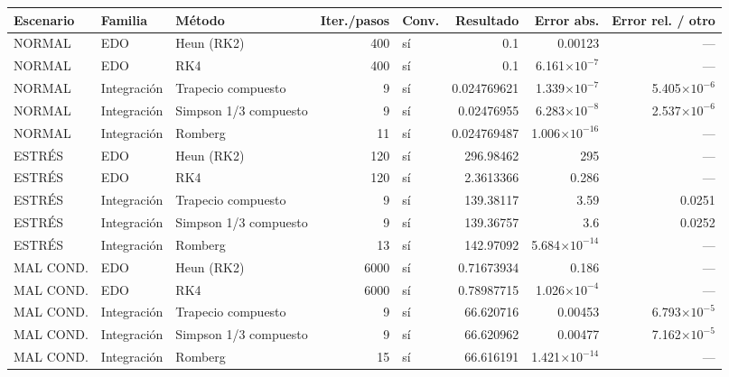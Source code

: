 {\footnotesize
\begin{longtable}{lllrlrrr}
\toprule
\textbf{Escenario} & \textbf{Familia} & \textbf{Método} & \textbf{Iter./pasos} & \textbf{Conv.} & \textbf{Resultado} & \textbf{Error abs.} & \textbf{Error rel. / otro} \\
\midrule
\endhead
NORMAL & EDO & Heun (RK2) & 400 & sí & 0.1 & 0.00123 & — \\
NORMAL & EDO & RK4 & 400 & sí & 0.1 & 6.161$\times10^{-7}$ & — \\
NORMAL & Integración & Trapecio compuesto & 9 & sí & 0.024769621 & 1.339$\times10^{-7}$ & 5.405$\times10^{-6}$ \\
NORMAL & Integración & Simpson 1/3 compuesto & 9 & sí & 0.02476955 & 6.283$\times10^{-8}$ & 2.537$\times10^{-6}$ \\
NORMAL & Integración & Romberg & 11 & sí & 0.024769487 & 1.006$\times10^{-16}$ & — \\
ESTRÉS & EDO & Heun (RK2) & 120 & sí & 296.98462 & 295 & — \\
ESTRÉS & EDO & RK4 & 120 & sí & 2.3613366 & 0.286 & — \\
ESTRÉS & Integración & Trapecio compuesto & 9 & sí & 139.38117 & 3.59 & 0.0251 \\
ESTRÉS & Integración & Simpson 1/3 compuesto & 9 & sí & 139.36757 & 3.6 & 0.0252 \\
ESTRÉS & Integración & Romberg & 13 & sí & 142.97092 & 5.684$\times10^{-14}$ & — \\
MAL COND. & EDO & Heun (RK2) & 6000 & sí & 0.71673934 & 0.186 & — \\
MAL COND. & EDO & RK4 & 6000 & sí & 0.78987715 & 1.026$\times10^{-4}$ & — \\
MAL COND. & Integración & Trapecio compuesto & 9 & sí & 66.620716 & 0.00453 & 6.793$\times10^{-5}$ \\
MAL COND. & Integración & Simpson 1/3 compuesto & 9 & sí & 66.620962 & 0.00477 & 7.162$\times10^{-5}$ \\
MAL COND. & Integración & Romberg & 15 & sí & 66.616191 & 1.421$\times10^{-14}$ & — \\
\bottomrule
\end{longtable}
}
